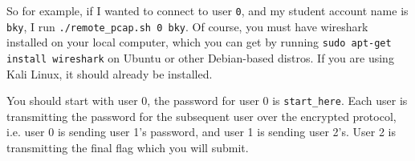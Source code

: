 {                    So for example, if I wanted to connect to user \lstinline`0`, and my student account name is \lstinline`bky`, I run \lstinline`./remote_pcap.sh 0 bky`. 
                    Of course, you must have wireshark installed on your local computer, which you can get by running \lstinline`sudo apt-get install wireshark` on Ubuntu or other Debian-based distros.
                    If you are using Kali Linux, it should already be installed.

                    You should start with user 0, the password for user 0 is \lstinline`start_here`. %
Each user is transmitting the password for the subsequent user over the encrypted protocol, i.e. %
user 0 is sending user 1's password, and user 1 is sending user 2's. %
User 2 is transmitting the final flag which you will submit. 

}
